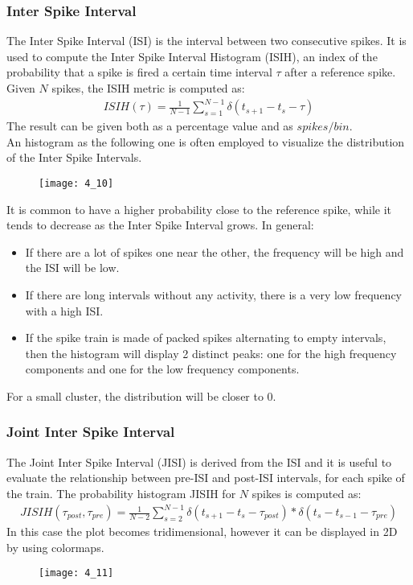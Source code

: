 \subsubsection{Inter Spike Interval}
The Inter Spike Interval (ISI) is the interval between two consecutive spikes. It is used to
compute the Inter Spike Interval Histogram (ISIH), an index of the probability that a spike
is fired a certain time interval \(\tau\) after a reference spike. Given \(N\) spikes, the
ISIH metric is computed as:
\begin{align*}
    ISIH(\tau)=\frac{1}{N-1}\sum_{s=1}^{N-1}\delta{(t_{s+1}-t_{s}-\tau)}
\end{align*}
The result can be given both as a percentage value and as \(spikes/bin\).\\
An histogram as the following one is often employed to visualize the distribution of the
Inter Spike Intervals.
\begin{figure}[H]
    \texttt{[image: 4\_10]}
    \centering
\end{figure}
It is common to have a higher probability close to the reference spike, while it tends to
decrease as the Inter Spike Interval grows.
In general:
\begin{itemize}
    \item If there are a lot of spikes one near the other, the frequency will be high and
          the ISI will be low.
    \item If there are long intervals without any activity, there is a very low frequency
          with a high ISI.
    \item If the spike train is made of packed spikes alternating to empty intervals, then
          the histogram will display 2 distinct peaks: one for the high frequency components and
          one for the low frequency components.
\end{itemize}
For a small cluster, the distribution will be closer to 0.
\subsubsection{Joint Inter Spike Interval}
The Joint Inter Spike Interval (JISI) is derived from the ISI and it is useful to evaluate the
relationship between pre-ISI and post-ISI intervals, for each spike of the train.
The probability histogram JISIH for \(N\) spikes is computed as:
\begin{align*}
    JISIH(\tau_{post},\tau_{pre})=\frac{1}{N-2}\sum_{s=2}^{N-1}\delta{(t_{s+1}-t_{s}-\tau_{post})}\ast \delta{(t_s-t_{s-1}-\tau_{pre})}
\end{align*}
In this case the plot becomes tridimensional, however it can be displayed in 2D by using
colormaps.
\begin{figure}[H]
    \texttt{[image: 4\_11]}
    \centering
\end{figure}
